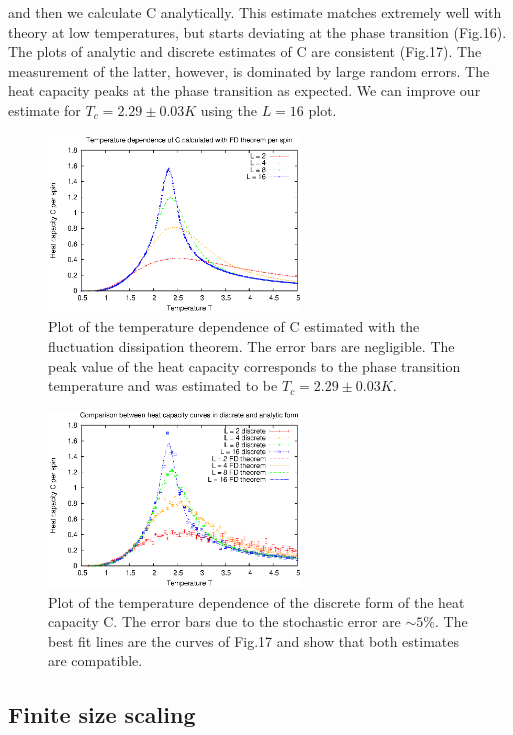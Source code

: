 \documentclass[a4paper]{article}
\begin{document}
and then we calculate C analytically. This estimate matches extremely well with theory at low temperatures, but starts deviating at the phase transition (Fig.16). The plots of analytic and discrete estimates of C are consistent (Fig.17). The measurement of the latter, however, is dominated by large random errors. The heat capacity peaks at the phase transition as expected. We can improve our estimate for $T_c = 2.29 \pm 0.03 K$ using the $L = 16$ plot.

\begin{figure} [H]
\centering
\includegraphics[width=0.6\textwidth]{fluctuation.eps}
\caption{\label{fig:generic} Plot of the temperature dependence of C estimated with the fluctuation dissipation theorem. The error bars are negligible. The peak value of the heat capacity corresponds to the phase transition temperature and was estimated to be $T_c = 2.29 \pm 0.03 K$.}
\end{figure}

\begin{figure} [H]
\centering
\includegraphics[width=0.6\textwidth]{discrete.eps}
\caption{\label{fig:generic} Plot of the temperature dependence of the discrete form of the heat capacity C. The error bars due to the stochastic error are $\sim 5\%$. The best fit lines are the curves of Fig.17 and show that both estimates are compatible. }
\end{figure}

 \subsection{Finite size scaling}
\end{document}
